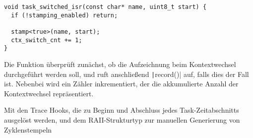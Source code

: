 \begin{code}
\begin{verbatim}
void task_switched_isr(const char* name, uint8_t start) {
  if (!stamping_enabled) return;

  stamp<true>(name, start);
  ctx_switch_cnt += 1;
}
\end{verbatim}
\end{code}

Die Funktion überprüft zunächst, ob die Aufzeichnung beim Kontextwechsel
durchgeführt werden soll, und ruft anschließend \texttt|record()| auf,
falls dies der Fall ist. Nebenbei wird ein Zähler inkrementiert, der die
akkumulierte Anzahl der Kontextwechsel repräsentiert.


Mit den Trace Hooks, die zu Beginn und Abschluss jedes Task-Zeitabschnitts
ausgelöst werden, und dem RAII-Strukturtyp zur manuellen Generierung von
Zyklenstempeln
